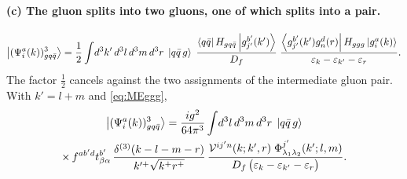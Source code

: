 \paragraph{(c) The gluon splits into two gluons, one of which splits into a pair.}
\begin{center}
\end{center}
\begin{equation}
\left|(\Psi^{a}_{i}(k))^{3}_{gq\bar q}\right\rangle=\frac12\int\! d^{3}k'\,d^{3}l\,d^{3}m\,d^{3}r\;
\left|q\bar q\,g\right\rangle\;
\frac{\left\langle q\bar q\right|H_{gq\bar q}\left|g^{b'}_{j'}(k')\right\rangle}{D_{f}}\;
\frac{\left\langle g^{b'}_{j'}(k')g^{d}_{n}(r)\right|H_{ggg}\left|g^{a}_{i}(k)\right\rangle}{\varepsilon_{k}-\varepsilon_{k'}-\varepsilon_{r}} .
\end{equation}
The factor $\tfrac12$ cancels against the two assignments of the intermediate gluon pair. With
$k'=l+m$ and \eqref{eq:MEggg},
\begin{multline}
\left|(\Psi^{a}_{i}(k))^{3}_{gq\bar q}\right\rangle=\frac{ig^{2}}{64\pi^{3}}\int\! d^{3}l\,d^{3}m\,d^{3}r\;
\left|q\bar q\,g\right\rangle\\
\times\,f^{ab'd}t^{b'}_{\beta\alpha}\,\frac{\delta^{(3)}(k-l-m-r)}{k'^{+}\sqrt{k^{+}r^{+}}}\,
\frac{\mathcal{V}^{ij'n}(k;k',r)\;\Phi^{j'}_{\lambda_{1}\lambda_{2}}(k';l,m)}
{D_{f}\,\big(\varepsilon_{k}-\varepsilon_{k'}-\varepsilon_{r}\big)} .
\label{eq:B3c}
\end{multline}


